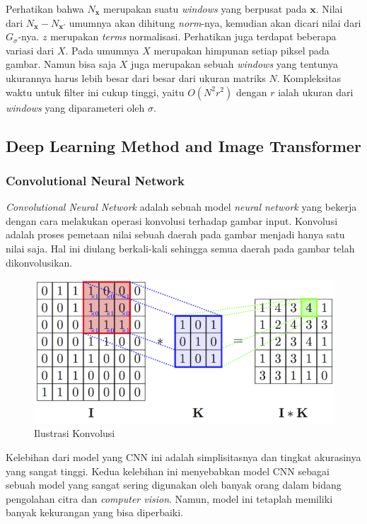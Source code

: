 \documentclass[11pt, a4paper, final]{report}
\begin{document}
Perhatikan bahwa $N_{\bm{x}}$ merupakan suatu \textit{windows} yang berpusat pada $\bm{x}$. Nilai dari $N_{\bm{x}} - N_{\bm{x}'}$ umumnya akan dihitung \textit{norm}-nya, kemudian akan dicari nilai dari $G_\sigma$-nya. $z$ merupakan \textit{terms} normalisasi. Perhatikan juga terdapat beberapa variasi dari $X$. Pada umumnya $X$ merupakan himpunan setiap piksel pada gambar. Namun bisa saja $X$ juga merupakan sebuah \textit{windows} yang tentunya ukurannya harus lebih besar dari besar dari ukuran matriks $N$. Kompleksitas waktu untuk filter ini cukup tinggi, yaitu $O(N^2 r^2)$ dengan $r$ ialah ukuran dari \textit{windows} yang diparameteri oleh $\sigma$.

\subsection{Deep Learning Method and Image Transformer}

\subsubsection{Convolutional Neural Network}

\textit{Convolutional Neural Network} adalah sebuah model \textit{neural network} yang bekerja dengan cara melakukan operasi konvolusi terhadap gambar input. Konvolusi adalah proses pemetaan nilai sebuah daerah pada gambar menjadi hanya satu nilai saja. Hal ini diulang berkali-kali sehingga semua daerah pada gambar telah dikonvolusikan.

\begin{figure}[H]
\centering
\includegraphics[scale=0.6]{assets/convolution.png}
\caption{Ilustrasi Konvolusi \cite{deepl2021}}
\end{figure}

Kelebihan dari model yang CNN ini adalah simplisitasnya dan tingkat akurasinya yang sangat tinggi. Kedua kelebihan ini menyebabkan model CNN sebagai sebuah model yang sangat sering digunakan oleh banyak orang dalam bidang pengolahan citra dan \textit{computer vision}. Namun, model ini tetaplah memiliki banyak kekurangan yang bisa diperbaiki.
\end{document}
